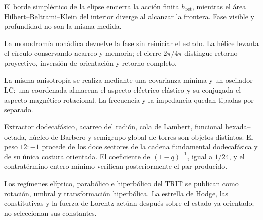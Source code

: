 \begin{exactbox}[title={Finitud simpléctica del borde y divergencia del área hiperbólica interior}]
El borde simpléctico de la elipse encierra la acción finita
\(h_{\mathrm{ret}}\), mientras el área Hilbert--Beltrami--Klein del interior
diverge al alcanzar la frontera. Fase visible y profundidad no son la misma
medida.
\end{exactbox}

\begin{exactbox}[title={Elevación helicoidal nonádica con retorno de fase y avance de memoria}]
La monodromía nonádica devuelve la fase sin reiniciar el estado. La hélice
levanta el círculo conservando acarreo y memoria; el cierre \(2\pi/4\pi\)
distingue retorno proyectivo, inversión de orientación y retorno completo.
\end{exactbox}

\begin{narrativebox}[title={Realización oscilatoria y constitutiva electromagnética}]
La misma anisotropía se realiza mediante una covarianza mínima y un oscilador
LC: una coordenada almacena el aspecto eléctrico-elástico y su conjugada el
aspecto magnético-rotacional. La frecuencia y la impedancia quedan tipadas por
separado.
\end{narrativebox}

\begin{exactbox}[title={Separación tipada de los operadores \(90/120\)}]
Extractor dodecafásico, acarreo del radión, cola de Lambert, funcional
hexada--octada, núcleo de Barbero y semigrupo global de torres son objetos
distintos. El peso \(12:-1\) procede de los doce sectores de la cadena
fundamental dodecafásica y de su única costura orientada. El coeficiente de
\((1-q)^{-1}\), igual a \(1/24\), y el contratérmino entero mínimo verifican
posteriormente el par producido.
\end{exactbox}

\begin{narrativebox}[title={Realizaciones compleja, lorentziana y dual de Hodge}]
Los regímenes elíptico, parabólico e hiperbólico del TRIT se publican como
rotación, umbral y transformación hiperbólica. La estrella de Hodge, las constitutivas y la fuerza
de Lorentz actúan después sobre el estado ya orientado; no seleccionan sus
constantes.
\end{narrativebox}

